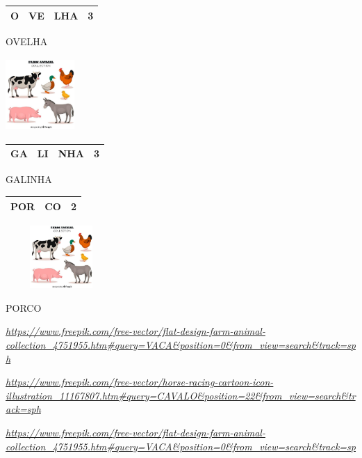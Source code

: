 \begin{longtable}[]{@{}llll@{}}
\toprule
O & VE & LHA & 3\tabularnewline
\bottomrule
\end{longtable}

OVELHA

\includegraphics[width=1.03125in,height=1.09419in]{media/image27.jpg}

\begin{longtable}[]{@{}llll@{}}
\toprule
GA & LI & NHA & 3\tabularnewline
\bottomrule
\end{longtable}

GALINHA

\begin{longtable}[]{@{}lll@{}}
\toprule
POR & CO & 2\tabularnewline
\bottomrule
\end{longtable}

\includegraphics[width=1.66606in,height=0.94389in]{media/image27.jpg}

PORCO

\href{https://www.freepik.com/free-vector/flat-design-farm-animal-collection_4751955.htm\#query=VACA\&position=0\&from_view=search\&track=sph}{\emph{https://www.freepik.com/free-vector/flat-design-farm-animal-collection\_4751955.htm\#query=VACA\&position=0\&from\_view=search\&track=sph}}

\href{https://www.freepik.com/free-vector/horse-racing-cartoon-icon-illustration_11167807.htm\#query=CAVALO\&position=22\&from_view=search\&track=sph}{\emph{https://www.freepik.com/free-vector/horse-racing-cartoon-icon-illustration\_11167807.htm\#query=CAVALO\&position=22\&from\_view=search\&track=sph}}

\href{https://www.freepik.com/free-vector/flat-design-farm-animal-collection_4751955.htm\#query=VACA\&position=0\&from_view=search\&track=sp}{\emph{https://www.freepik.com/free-vector/flat-design-farm-animal-collection\_4751955.htm\#query=VACA\&position=0\&from\_view=search\&track=sp}}

